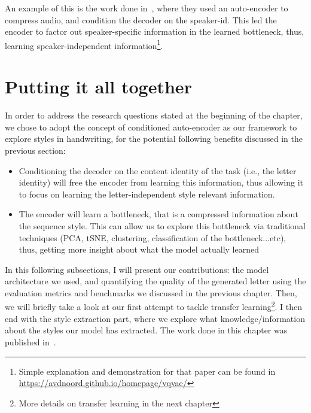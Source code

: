     \par An example of this is the work done in~\citep{van2017neural}, where they used an auto-encoder to compress audio, and condition the decoder on the speaker-id. This led the encoder to factor out speaker-specific information in the learned bottleneck, thus, learning speaker-independent information\footnote{Simple explanation and demonstration for that paper can be found in \url{https://avdnoord.github.io/homepage/vqvae/}}.

\section{Putting it all together}
  \par In order to address the research questions stated at the beginning of the chapter, we chose to adopt the concept of conditioned auto-encoder as our framework to explore styles in handwriting, for the potential following benefits discussed in the previous section:
  \begin{itemize}
    \item Conditioning the decoder on the content identity of the task (i.e., the letter identity) will free the encoder from learning this information, thus allowing it to focus on learning the letter-independent style relevant information.
    \item The encoder will learn a bottleneck, that is a compressed information about the sequence style. This can allow us to explore this bottleneck via traditional techniques (PCA, tSNE, clustering, classification of the bottleneck...etc), thus, getting more insight about what the model actually learned
  \end{itemize}

  \par In this following subsections, I will present our contributions: the model architecture we used, and quantifying the quality of the generated letter using the evaluation metrics and benchmarks we discussed in the previous chapter. Then, we will briefly take a look at our first attempt to tackle transfer learning\footnote{More details on transfer learning in the next chapter}. I then end with the style extraction part, where we explore what knowledge/information about the styles our model has extracted. The work done in this chapter was published in~\citep{icaart19}.

